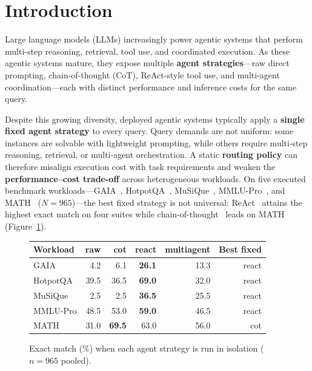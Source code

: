 \section{Introduction}
\label{sec:intro}

Large language models (LLMs) increasingly power agentic systems that perform multi-step
reasoning, retrieval, tool use, and coordinated execution.
As these agentic systems mature, they expose multiple \textbf{agent strategies}---raw direct
prompting, chain-of-thought (CoT), ReAct-style tool use, and multi-agent coordination---each
with distinct performance and inference costs for the same query.

Despite this growing diversity, deployed agentic systems typically apply a \textbf{single fixed
agent strategy} to every query.
Query demands are not uniform: some instances are solvable with lightweight prompting, while
others require multi-step reasoning, retrieval, or multi-agent orchestration.
A static \textbf{routing policy} can therefore misalign execution cost with task requirements and
weaken the \textbf{performance--cost trade-off} across heterogeneous workloads.
On five executed benchmark workloads---GAIA~\citep{mialon2023gaia}, HotpotQA~\citep{yang2018hotpotqa},
MuSiQue~\citep{trivedi2022musique}, MMLU-Pro~\citep{wang2024mmlupro}, and MATH~\citep{hendrycks2021math}
($N{=}965$)---the best fixed strategy is not universal: ReAct~\citep{yao2023react} attains the
highest exact match on four suites while chain-of-thought~\citep{wei2022cot} leads on MATH
(Figure~\ref{fig:fixed-strategy-em}).

\begin{figure}[t]
  \centering
  \footnotesize
  \setlength{\tabcolsep}{3pt}
  \caption{Exact match (\%) when each agent strategy is run in isolation ($n{=}965$ pooled).}
  \label{fig:fixed-strategy-em}
  \begin{tabular}{@{}lrrrrr@{}}
    \toprule
    Workload & raw & cot & react & multiagent & Best fixed \\
    \midrule
    GAIA & 4.2 & 6.1 & \textbf{26.1} & 13.3 & react \\
    HotpotQA & 39.5 & 36.5 & \textbf{69.0} & 32.0 & react \\
    MuSiQue & 2.5 & 2.5 & \textbf{36.5} & 25.5 & react \\
    MMLU-Pro & 48.5 & 53.0 & \textbf{59.0} & 46.5 & react \\
    MATH & 31.0 & \textbf{69.5} & 63.0 & 56.0 & cot \\
    \bottomrule
  \end{tabular}
\end{figure}

